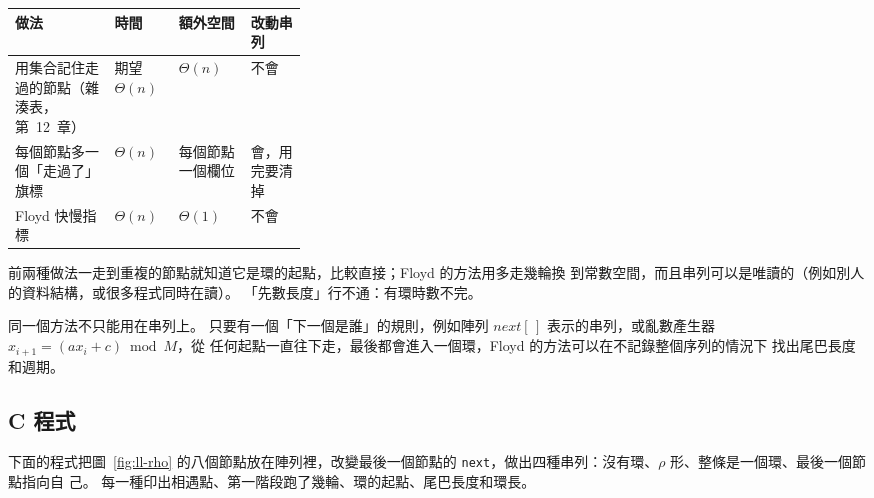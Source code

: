 \begin{center}
\begin{tabular}{>{\raggedright\arraybackslash}p{0.34\linewidth}lll}
\toprule
做法 & 時間 & 額外空間 & 改動串列 \\
\midrule
用集合記住走過的節點（雜湊表，第~12~章）& 期望 $\Theta(n)$ & $\Theta(n)$ & 不會 \\
每個節點多一個「走過了」旗標 & $\Theta(n)$ & 每個節點一個欄位 & 會，用完要清掉 \\
Floyd 快慢指標 & $\Theta(n)$ & $\Theta(1)$ & 不會 \\
\bottomrule
\end{tabular}
\end{center}

前兩種做法一走到重複的節點就知道它是環的起點，比較直接；Floyd 的方法用多走幾輪換
到常數空間，而且串列可以是唯讀的（例如別人的資料結構，或很多程式同時在讀）。
「先數長度」行不通：有環時數不完。

同一個方法不只能用在串列上。 只要有一個「下一個是誰」的規則，例如陣列
$\mathit{next}[\,]$ 表示的串列，或亂數產生器 $x_{i+1} = (a x_i + c) \bmod M$，從
任何起點一直往下走，最後都會進入一個環，Floyd 的方法可以在不記錄整個序列的情況下
找出尾巴長度和週期。

\subsection{C 程式}

下面的程式把圖~\ref{fig:ll-rho} 的八個節點放在陣列裡，改變最後一個節點的
\texttt{next}，做出四種串列：沒有環、$\rho$ 形、整條是一個環、最後一個節點指向自
己。 每一種印出相遇點、第一階段跑了幾輪、環的起點、尾巴長度和環長。

